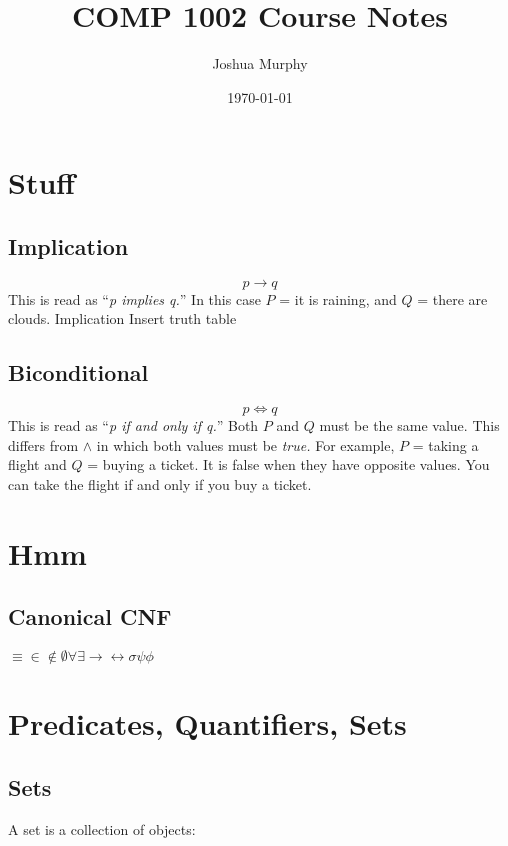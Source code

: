 \documentclass[titlepage]{article}
\title{COMP 1002 Course Notes}
\author{Joshua Murphy}
\date{\today}
\begin{document}
\maketitle
\tableofcontents{}
\pagebreak

\section{Stuff}
\subsection{Implication}
\begin{equation}
p \to q \end{equation}
This is read as ``\textit{p implies q.}'' In this case $P$ = it is raining, 
and $Q$ = there are clouds. \gls{Implication}
Insert truth table

\subsection{Biconditional}
\begin{equation}
p \iff q \end{equation}
This is read as ``\textit{p if and only if q.}'' Both $P$ and $Q$ must be the
same value. This differs from $\wedge$ in which both values must be
\textit{true.} For example, $P$ = taking a flight and $Q$ = buying a ticket. It
is false when they have opposite values. You can take the flight if and only if
you buy a ticket.

\section{Hmm}
\subsection{Canonical CNF}

$\equiv \in \notin \emptyset \forall \exists \rightarrow \leftrightarrow \sigma
\psi \phi $
\section{Predicates, Quantifiers, Sets}

\subsection{Sets}

A set is a collection of objects:
\end{document}
